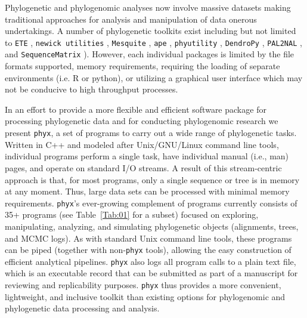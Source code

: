 \documentclass{bioinfo}
\begin{document}
Phylogenetic and phylogenomic analyses now involve massive datasets making traditional approaches for analysis and manipulation of data onerous undertakings. A number of
phylogenetic toolkits exist including but not limited to \texttt{ETE} \citep{HuertaCepas2016}, \texttt{newick utilities} \citep{JunierZdobnov2010}, \texttt{Mesquite}
\citep{MaddisonMaddison2016}, \texttt{ape} \citep{Popescu2012},
\texttt{phyutility} \citep{SmithDunn2008}, \texttt{DendroPy}
\citep{SukumaranHolder2010}, \texttt{PAL2NAL} \citep{Suyama2006}, and
\texttt{SequenceMatrix} \citep{Vaidya2011}). However, each individual
packages is limited by the file formats supported, memory requirements,
requiring the loading of separate environments (i.e. R or python), or
utilizing a graphical user interface which may not be conducive to high
throughput processes.

In an effort to provide a more flexible and efficient software package for processing phylogenetic data and for conducting phylogenomic research we present \texttt{phyx}, a set of programs to carry
out a wide range of phylogenetic tasks. Written in C++ and modeled after
Unix/GNU/Linux command line tools, individual programs perform a single task,
have individual manual (i.e., man) pages, and operate on standard I/O streams. A result of
this stream-centric approach is that, for most programs, only a single sequence
or tree is in memory at any moment. Thus, large data sets can be
processed with minimal memory requirements. \texttt{phyx}'s
ever-growing complement of programs currently consists of 35+ programs
(see Table~\ref{Tab:01} for a subset) focused on exploring, manipulating, analyzing,
and simulating phylogenetic objects (alignments, trees, and MCMC logs).
As with standard Unix command line tools, these programs can be piped
(together with non-\texttt{phyx} tools), allowing the easy construction
of efficient analytical pipelines. \texttt{phyx} also logs all program calls
to a plain text file, which is an executable record that can be submitted as
part of a manuscript for reviewing and replicability purposes. 
\texttt{phyx} thus provides a more convenient, lightweight, and inclusive toolkit than existing options for phylogenomic and phylogenetic data processing and analysis. 
\end{document}
